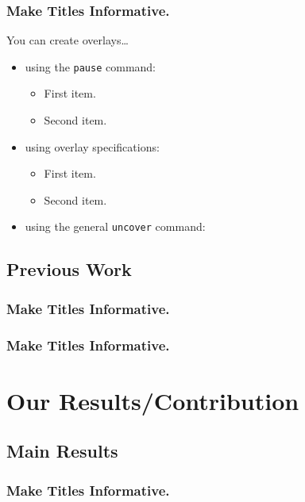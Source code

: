 \documentclass{beamer}
\begin{document}
\begin{frame}
  \frametitle{Make Titles Informative.}

  You can create overlays\dots
  \begin{itemize}
  \item using the \texttt{pause} command:
    \begin{itemize}
    \item
      First item.
      \pause
    \item    
      Second item.
    \end{itemize}
  \item
    using overlay specifications:
    \begin{itemize}
    \item<3->
      First item.
    \item<4->
      Second item.
    \end{itemize}
  \item
    using the general \texttt{uncover} command:
    \begin{itemize}
    \end{itemize}
  \end{itemize}
\end{frame}


\subsection{Previous Work}

\begin{frame}
  \frametitle{Make Titles Informative.}
\end{frame}

\begin{frame}
  \frametitle{Make Titles Informative.}
\end{frame}



\section{Our Results/Contribution}

\subsection{Main Results}

\begin{frame}
  \frametitle{Make Titles Informative.}
\end{frame}
\end{document}
